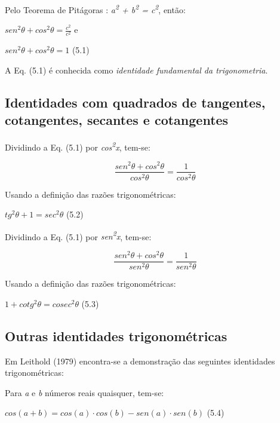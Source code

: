 Pelo Teorema de Pitágoras :  \textit{a\textsuperscript{2} + b\textsuperscript{2} = c\textsuperscript{2}}, então:  

 \( sen^{2} \theta  + cos^{2} \theta =\frac{c^{2}}{c^{2}} \)    \tab e

 \begin{caixa}
 \( sen^{2} \theta  + cos^{2} \theta =1 \) \tab (5.1)
 \end{caixa}

A Eq. (5.1) é conhecida como \textit{identidade fundamental da trigonometria}.

\subsection{Identidades com quadrados de tangentes, cotangentes, secantes e cotangentes}

Dividindo a Eq. (5.1) por \textit{cos\textsuperscript{2}x}, tem-se:

 \[ \frac{sen^{2} \theta  + cos^{2} \theta }{cos^{2} \theta }=\frac{1}{cos^{2} \theta } \]

Usando a definição das razões trigonométricas:

\begin{caixa}
 \( tg^{2} \theta  + 1=sec^{2} \theta   \) \tab (5.2)
\end{caixa}

Dividindo a Eq. (5.1) por \textit{sen\textsuperscript{2}x}, tem-se:

 \[ \frac{sen^{2} \theta  + cos^{2} \theta }{sen^{2} \theta }=\frac{1}{sen^{2} \theta } \]

Usando a definição das razões trigonométricas:

\begin{caixa}
 \( 1+cotg^{2} \theta  =cosec^{2} \theta   \) \tab (5.3)
\end{caixa}

\subsection{Outras identidades trigonométricas}

Em Leithold (1979) encontra-se a demonstração das seguintes identidades trigonométricas: 

Para \textit{a} e \textit{b} números reais quaisquer, tem-se:

 \( cos \left( a+b \right) =cos \left( a \right)  \cdot cos \left( b \right) -sen \left( a \right)  \cdot sen \left( b \right)  \)  \qquad (5.4)


